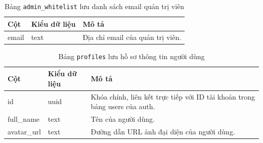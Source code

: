 \begin{table}[H]
\centering
\begin{tabular}{|l|l|p{6cm}|}
\hline
\textbf{Cột} & \textbf{Kiểu dữ liệu} & \textbf{Mô tả} \\ \hline
email & text & Địa chỉ email của quản trị viên. \\ \hline
\end{tabular}
\caption{Bảng \texttt{admin\_whitelist} lưu danh sách email quản trị viên}
\end{table}

\begin{table}[H]
\centering
\begin{tabular}{|l|l|p{6cm}|}
\hline
\textbf{Cột} & \textbf{Kiểu dữ liệu} & \textbf{Mô tả} \\ \hline
id & uuid & Khóa chính, liên kết trực tiếp với ID tài khoản trong bảng users của auth. \\ \hline
full\_name & text & Tên của người dùng. \\ \hline
avatar\_url & text & Đường dẫn URL ảnh đại diện của người dùng. \\ \hline
\end{tabular}
\caption{Bảng \texttt{profiles} lưu hồ sơ thông tin người dùng}
\end{table}

